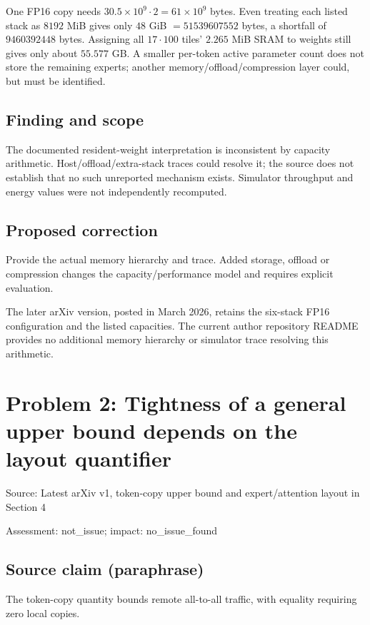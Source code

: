 \documentclass[11pt]{article}
\begin{document}
One FP16 copy needs \(30.5\times10^9\cdot2=61\times10^9\) bytes. Even treating each listed stack as \(8192\) MiB gives only \(48\) GiB \(=51539607552\) bytes, a shortfall of \(9460392448\) bytes. Assigning all \(17\cdot100\) tiles' \(2.265\) MiB SRAM to weights still gives only about \(55.577\) GB. A smaller per-token active parameter count does not store the remaining experts; another memory/offload/compression layer could, but must be identified.

\subsection*{Finding and scope}

The documented resident-weight interpretation is inconsistent by capacity arithmetic. Host/offload/extra-stack traces could resolve it; the source does not establish that no such unreported mechanism exists. Simulator throughput and energy values were not independently recomputed.

\subsection*{Proposed correction}

Provide the actual memory hierarchy and trace. Added storage, offload or compression changes the capacity/performance model and requires explicit evaluation.

The later arXiv version, posted in March 2026, retains the six-stack FP16 configuration and the listed capacities. The current author repository README provides no additional memory hierarchy or simulator trace resolving this arithmetic.

\section*{Problem 2: Tightness of a general upper bound depends on the layout quantifier}

Source: Latest arXiv v1, token-copy upper bound and expert/attention layout in Section 4

Assessment: not\_issue; impact: no\_issue\_found

\subsection*{Source claim (paraphrase)}

The token-copy quantity bounds remote all-to-all traffic, with equality requiring zero local copies.
\end{document}
